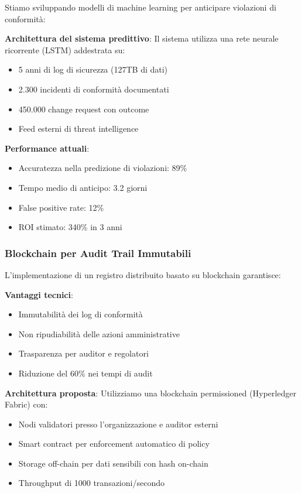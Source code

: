 Stiamo sviluppando modelli di machine learning per anticipare violazioni di conformità:

\textbf{Architettura del sistema predittivo}:
Il sistema utilizza una rete neurale ricorrente (LSTM) addestrata su:
\begin{itemize}
    \item 5 anni di log di sicurezza (127TB di dati)
    \item 2.300 incidenti di conformità documentati
    \item 450.000 change request con outcome
    \item Feed esterni di threat intelligence
\end{itemize}

\textbf{Performance attuali}:
\begin{itemize}
    \item Accuratezza nella predizione di violazioni: 89\%
    \item Tempo medio di anticipo: 3.2 giorni
    \item False positive rate: 12\%
    \item ROI stimato: 340\% in 3 anni
\end{itemize}

\subsubsection{\texorpdfstring{Blockchain per Audit Trail Immutabili}{4.9.2.2 - Blockchain per Audit Trail Immutabili}}

L'implementazione di un registro distribuito basato su blockchain garantisce:

\textbf{Vantaggi tecnici}:
\begin{itemize}
    \item Immutabilità dei log di conformità
    \item Non ripudiabilità delle azioni amministrative
    \item Trasparenza per auditor e regolatori
    \item Riduzione del 60\% nei tempi di audit
\end{itemize}

\textbf{Architettura proposta}:
Utilizziamo una blockchain permissioned (Hyperledger Fabric) con:
\begin{itemize}
    \item Nodi validatori presso l'organizzazione e auditor esterni
    \item Smart contract per enforcement automatico di policy
    \item Storage off-chain per dati sensibili con hash on-chain
    \item Throughput di 1000 transazioni/secondo
\end{itemize}

